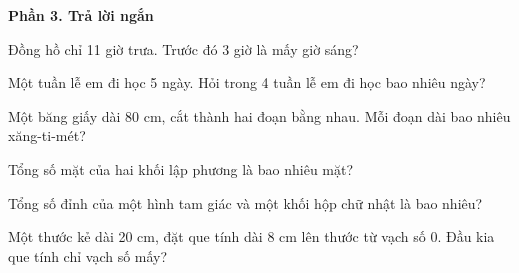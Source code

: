 \textbf{Phần 3. Trả lời ngắn}

\begin{ex} %
Đồng hồ chỉ 11 giờ trưa. Trước đó 3 giờ là mấy giờ sáng?
\end{ex}

\begin{ex} %
Một tuần lễ em đi học 5 ngày. Hỏi trong 4 tuần lễ em đi học bao nhiêu ngày?
\end{ex}

\begin{ex} %
Một băng giấy dài 80 cm, cắt thành hai đoạn bằng nhau. Mỗi đoạn dài bao nhiêu xăng-ti-mét?
\end{ex}

\begin{ex} %
Tổng số mặt của hai khối lập phương là bao nhiêu mặt?
\end{ex}

\begin{ex} %
Tổng số đỉnh của một hình tam giác và một khối hộp chữ nhật là bao nhiêu?
\end{ex}

\begin{ex} %
Một thước kẻ dài 20 cm, đặt que tính dài 8 cm lên thước từ vạch số 0. Đầu kia que tính chỉ vạch số mấy?
\end{ex}
